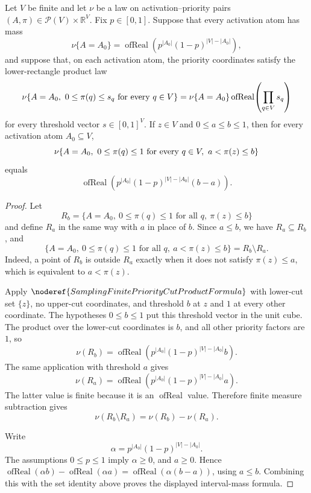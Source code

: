 \begin{helper}
Let \(V\) be finite and let \(\nu\) be a law on activation--priority pairs
\((A,\pi)\in\mathcal P(V)\times\mathbb R^V\).  Fix \(p\in[0,1]\).  Suppose
that every activation atom has mass
\[
\nu\{A=A_0\}=
\operatorname{ofReal}\!\left(p^{|A_0|}(1-p)^{|V|-|A_0|}\right),
\]
and suppose that, on each activation atom, the priority coordinates satisfy
the lower-rectangle product law
\[
\nu\{A=A_0,\ 0\le \pi(q)\le s_q\hbox{ for every }q\in V\}
=
\nu\{A=A_0\}\operatorname{ofReal}\!\left(\prod_{q\in V}s_q\right)
\]
for every threshold vector \(s\in[0,1]^V\).  If \(z\in V\) and
\(0\le a\le b\le1\), then for every activation atom \(A_0\subseteq V\),
\[
\nu\{A=A_0,\ 0\le\pi(q)\le1\hbox{ for every }q\in V,\ 
      a<\pi(z)\le b\}
\]
equals
\[
\operatorname{ofReal}\!\left(
p^{|A_0|}(1-p)^{|V|-|A_0|}(b-a)\right).
\]
\end{helper}
\begin{proof}
Let
\[
R_b=\{A=A_0,\ 0\le\pi(q)\le1\text{ for all }q,\ \pi(z)\le b\}
\]
and define \(R_a\) in the same way with \(a\) in place of \(b\).  Since
\(a\le b\), we have \(R_a\subseteq R_b\), and
\[
\{A=A_0,\ 0\le\pi(q)\le1\text{ for all }q,\ a<\pi(z)\le b\}
=R_b\setminus R_a .
\]
Indeed, a point of \(R_b\) is outside \(R_a\) exactly when it does not satisfy
\(\pi(z)\le a\), which is equivalent to \(a<\pi(z)\).

Apply \(\noderef{SamplingFinitePriorityCutProductFormula}\) with lower-cut
set \(\{z\}\), no upper-cut coordinates, and threshold \(b\) at \(z\) and
\(1\) at every other coordinate.  The hypotheses \(0\le b\le1\) put this
threshold vector in the unit cube.  The product over the lower-cut coordinates
is \(b\), and all other priority factors are \(1\), so
\[
\nu(R_b)=
\operatorname{ofReal}\!\left(
p^{|A_0|}(1-p)^{|V|-|A_0|}b\right).
\]
The same application with threshold \(a\) gives
\[
\nu(R_a)=
\operatorname{ofReal}\!\left(
p^{|A_0|}(1-p)^{|V|-|A_0|}a\right).
\]
The latter value is finite because it is an \(\operatorname{ofReal}\) value.
Therefore finite measure subtraction gives
\[
\nu(R_b\setminus R_a)=\nu(R_b)-\nu(R_a).
\]

Write
\[
\alpha=p^{|A_0|}(1-p)^{|V|-|A_0|}.
\]
The assumptions \(0\le p\le1\) imply \(\alpha\ge0\), and \(a\ge0\).  Hence
\(\operatorname{ofReal}(\alpha b)-\operatorname{ofReal}(\alpha a)
=\operatorname{ofReal}(\alpha(b-a))\), using \(a\le b\).  Combining this
with the set identity above proves the displayed interval-mass formula.
\end{proof}
